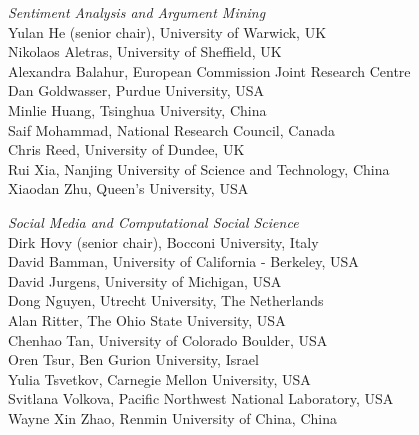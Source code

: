 \emph{Sentiment Analysis and Argument Mining} \\
\hspace*{0.2in}Yulan He (senior chair), University of Warwick, UK \\ 
\hspace*{0.2in}Nikolaos Aletras, University of Sheffield, UK \\
\hspace*{0.2in}Alexandra Balahur, European Commission Joint Research Centre \\
\hspace*{0.2in}Dan Goldwasser, Purdue University, USA \\
\hspace*{0.2in}Minlie Huang, Tsinghua University, China \\
\hspace*{0.2in}Saif Mohammad, National Research Council, Canada \\
\hspace*{0.2in}Chris Reed, University of Dundee, UK \\
\hspace*{0.2in}Rui Xia, Nanjing University of Science and Technology, China \\
\hspace*{0.2in}Xiaodan Zhu, Queen's University, USA


\emph{Social Media and Computational Social Science} \\
\hspace*{0.2in}Dirk Hovy (senior chair), Bocconi University, Italy \\
\hspace*{0.2in}David Bamman, University of California - Berkeley, USA \\
\hspace*{0.2in}David Jurgens, University of Michigan, USA \\
\hspace*{0.2in}Dong Nguyen, Utrecht University, The Netherlands \\
\hspace*{0.2in}Alan Ritter, The Ohio State University, USA \\
\hspace*{0.2in}Chenhao Tan, University of Colorado Boulder, USA \\
\hspace*{0.2in}Oren Tsur, Ben Gurion University, Israel \\
\hspace*{0.2in}Yulia Tsvetkov, Carnegie Mellon University, USA \\
\hspace*{0.2in}Svitlana Volkova, Pacific Northwest National Laboratory, USA \\
\hspace*{0.2in}Wayne Xin Zhao, Renmin University of China, China


